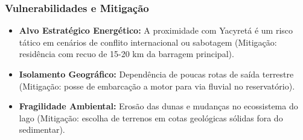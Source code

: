 \subsubsection{Vulnerabilidades e
Mitigação}

\begin{itemize}
\tightlist
\item
  \textbf{Alvo Estratégico Energético:} A proximidade com Yacyretá é um
  risco tático em cenários de conflito internacional ou sabotagem
  (Mitigação: residência com recuo de 15-20 km da barragem principal).
\item
  \textbf{Isolamento Geográfico:} Dependência de poucas rotas de saída
  terrestre (Mitigação: posse de embarcação a motor para via fluvial no
  reservatório).
\item
  \textbf{Fragilidade Ambiental:} Erosão das dunas e mudanças no
  ecossistema do lago (Mitigação: escolha de terrenos em cotas
  geológicas sólidas fora do sedimentar).
\end{itemize}

